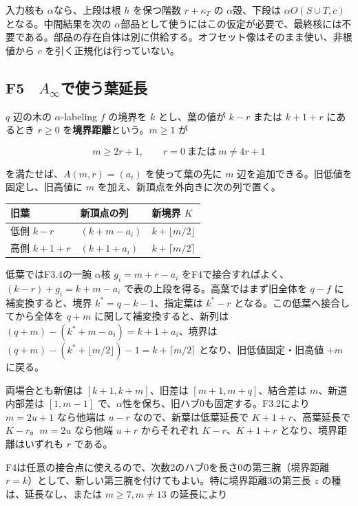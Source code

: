 \documentclass[
  10pt,
  a4paper,
]{article}
\begin{document}
入力核も \(\alpha\)なら、上段は根 \(h\) を保つ階数 \(r+\kappa_T\) の
\(\alpha\)殻、下段は \(\alpha O(S\cup T,c)\) となる。中間結果を次の
\(\alpha\)部品として使うにはこの仮定が必要で、最終核には不要である。部品の存在自体は別に供給する。オフセット像はそのまま使い、非根値から
\(c\) を引く正規化は行っていない。

\subsection{\texorpdfstring{F5　\(A_\infty\)で使う葉延長}{F5　A\_\textbackslash inftyで使う葉延長}}\label{f5-a_inftyux3067ux4f7fux3046ux8449ux5ef6ux9577}

\(q\) 辺の木の \(\alpha\)-labeling \(f\) の境界を \(k\) とし、葉の値が
\(k-r\) または \(k+1+r\) にあるとき \(r\ge0\)
を\textbf{境界距離}という。\(m\ge1\) が

\[
m\ge2r+1,\qquad r=0\ \text{または}\ m\ne4r+1
\tag{F5.1}
\]

を満たせば、\(A(m,r)=(a_i)\) を使って葉の先に \(m\)
辺を追加できる。旧低値を固定し、旧高値に \(m\)
を加え、新頂点を外向きに次の列で置く。

\begin{longtable}[]{@{}lll@{}}
\toprule\noalign{}
旧葉 & 新頂点の列 & 新境界 \(K\) \\
\midrule\noalign{}
\endhead
\bottomrule\noalign{}
\endlastfoot
低側 \(k-r\) & \((k+m-a_i)\) & \(k+\lfloor m/2\rfloor\) \\
高側 \(k+1+r\) & \((k+1+a_i)\) & \(k+\lceil m/2\rceil\) \\
\end{longtable}

低葉ではF3.4の一腕 \(\alpha\)核 \(g_i=m+r-a_i\)
をF4で接合すればよく、\((k-r)+g_i=k+m-a_i\)
で表の上段を得る。高葉ではまず旧全体を \(q-f\) に補変換すると、境界
\(k^*=q-k-1\)、指定葉は \(k^*-r\) となる。この低葉へ接合してから全体を
\(q+m\) に関して補変換すると、新列は
\((q+m)-(k^*+m-a_i)=k+1+a_i\)、境界は
\((q+m)-(k^*+\lfloor m/2\rfloor)-1=k+\lceil m/2\rceil\)
となり、旧低値固定・旧高値 \(+m\) に戻る。

両場合とも新値は \([k+1,k+m]\)、旧差は \([m+1,m+q]\)、結合差は
\(m\)、新道内部差は \([1,m-1]\)
で、\(\alpha\)性を保ち、旧ハブ0も固定する。F3.2により \(m=2u+1\)
なら他端は \(u-r\) なので、新葉は低葉延長で \(K+1+r\)、高葉延長で
\(K-r\)。\(m=2u\) なら他端 \(u+r\) からそれぞれ \(K-r\)、\(K+1+r\)
となり、境界距離はいずれも \(r\) である。

F4は任意の接合点に使えるので、次数2のハブ0を長さ0の第三腕（境界距離
\(r=k\)）として、新しい第三腕を付けてもよい。特に境界距離3の第三長 \(z\)
の種は、延長なし、または \(m\ge7,m\ne13\) の延長により
\end{document}
